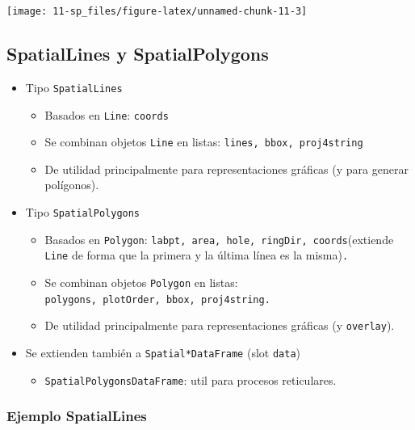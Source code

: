 \documentclass[
  spanish,
]{book}
\providecommand{\tightlist}{%
  \setlength{\itemsep}{0pt}\setlength{\parskip}{0pt}}
\theoremstyle{break}
\theoremstyle{definition}
\theoremstyle{definition}
\theoremstyle{definition}
\theoremstyle{definition}
\theoremstyle{remark}
\begin{document}
\begin{center}\texttt{[image: 11-sp\_files/figure-latex/unnamed-chunk-11-3]} \end{center}

\hypertarget{spatiallines-y-spatialpolygons}{%
\subsection{SpatialLines y SpatialPolygons}\label{spatiallines-y-spatialpolygons}}

\begin{itemize}
\item
  Tipo \texttt{SpatialLines}

  \begin{itemize}
  \item
    Basados en \texttt{Line}: \texttt{coords}
  \item
    Se combinan objetos \texttt{Line} en listas: \texttt{lines,\ bbox,\ proj4string}
  \item
    De utilidad principalmente para representaciones gráficas (y
    para generar polígonos).
  \end{itemize}
\item
  Tipo \texttt{SpatialPolygons}

  \begin{itemize}
  \item
    Basados en \texttt{Polygon}:
    \texttt{labpt,\ area,\ hole,\ ringDir,\ coords}(extiende \texttt{Line} de forma
    que la primera y la última línea es la misma)\texttt{.}
  \item
    Se combinan objetos \texttt{Polygon} en listas:
    \texttt{polygons,\ plotOrder,\ bbox,\ proj4string.}
  \item
    De utilidad principalmente para representaciones gráficas (y
    \texttt{overlay}).
  \end{itemize}
\item
  Se extienden también a \texttt{Spatial*DataFrame} (slot \texttt{data})

  \begin{itemize}
  \tightlist
  \item
    \texttt{SpatialPolygonsDataFrame}: util para procesos reticulares.
  \end{itemize}
\end{itemize}

\hypertarget{ejemplo-spatiallines}{%
\subsubsection{Ejemplo SpatialLines}\label{ejemplo-spatiallines}}
\end{document}
